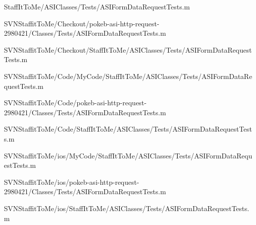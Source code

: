 \begin{DoxyCompactItemize}
\-Staff\-It\-To\-Me/\-A\-S\-I\-Classes/\-Tests/\-A\-S\-I\-Form\-Data\-Request\-Tests.\-m\item 
\-S\-V\-N\-Staffit\-To\-Me/\-Checkout/pokeb-\/asi-\/http-\/request-\/2980421/\-Classes/\-Tests/\-A\-S\-I\-Form\-Data\-Request\-Tests.\-m\item 
\-S\-V\-N\-Staffit\-To\-Me/\-Checkout/\-Staff\-It\-To\-Me/\-A\-S\-I\-Classes/\-Tests/\-A\-S\-I\-Form\-Data\-Request\-Tests.\-m\item 
\-S\-V\-N\-Staffit\-To\-Me/\-Code/\-My\-Code/\-Staff\-It\-To\-Me/\-A\-S\-I\-Classes/\-Tests/\-A\-S\-I\-Form\-Data\-Request\-Tests.\-m\item 
\-S\-V\-N\-Staffit\-To\-Me/\-Code/pokeb-\/asi-\/http-\/request-\/2980421/\-Classes/\-Tests/\-A\-S\-I\-Form\-Data\-Request\-Tests.\-m\item 
\-S\-V\-N\-Staffit\-To\-Me/\-Code/\-Staff\-It\-To\-Me/\-A\-S\-I\-Classes/\-Tests/\-A\-S\-I\-Form\-Data\-Request\-Tests.\-m\item 
\-S\-V\-N\-Staffit\-To\-Me/ios/\-My\-Code/\-Staff\-It\-To\-Me/\-A\-S\-I\-Classes/\-Tests/\-A\-S\-I\-Form\-Data\-Request\-Tests.\-m\item 
\-S\-V\-N\-Staffit\-To\-Me/ios/pokeb-\/asi-\/http-\/request-\/2980421/\-Classes/\-Tests/\-A\-S\-I\-Form\-Data\-Request\-Tests.\-m\item 
\-S\-V\-N\-Staffit\-To\-Me/ios/\-Staff\-It\-To\-Me/\-A\-S\-I\-Classes/\-Tests/\-A\-S\-I\-Form\-Data\-Request\-Tests.\-m\end{DoxyCompactItemize}
